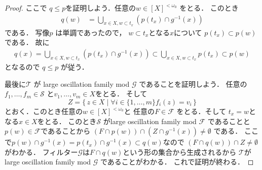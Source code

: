 \documentclass[leqno, a4paper, 12pt]{jsarticle}
\newcommand{\myfinset}[1]{[#1]^{<\omega_{0}}}
\newcommand{\myfil}[1]{\mathcal{#1}}
\newcommand{\myfam}[1]{\mathscr{#1}}
\begin{document}
\begin{proof}
ここで
$q\le p$を証明しよう．任意の$w\in \myfinset{X}$
をとる．
このとき
\begin{align*}
q(w)&=\bigcup_{x\in X, w\subset t_{x}}(p(t_{x})\cap g^{-1}(x))
\end{align*}
である．
写像$p$
は単調であったので，
$w\subset t_{x}$となる$x$について
$p(t_{x})\subset p(w)$である．
故に
\begin{align*}
q(x)=
\bigcup_{x\in X, w\subset t_{x}}(p(t_{x})\cap g^{-1}(x))
\subset 
\bigcup_{x\in X, w\subset t_{x}}p(t_{x})
\subset p(w)
\end{align*}
となるので
$q\le p$
が従う．

最後に$\myfam{T}$
が
large oscillation family mod $\myfil{G}$
であることを証明しよう．
任意の$f_{1}, \dots, f_{m}\in \myfam{S}$
と$v_{1}, \dots, v_{m}\in X$をとる．
そして
\[
Z=\{\, z\in X\mid \forall i\in \{1, \dots, m\} f_{i}(z)=v_{i}\, \}
\]
とおく．このとき任意の$w\in \myfinset{X}$と
任意の$F\in \myfil{F}$
をとる．そして
$t_{x}=w$となる$x\in X$をとる．
このとき$\myfam{S}$
がlarge oscillation family mod $\myfil{F}$
であることと$p(w)\in \myfil{F}$であることから
$(F\cap p(w))\cap(Z\cap g^{-1}(x))\neq \emptyset$
である．
ここで$p(w)\cap g^{-1}(x)=p(t_{x})\cap g^{-1}(x)\subset q(w)$なので
$(F\cap q(w))\cap Z\neq \emptyset$
がわかる．
フィルター$\myfil{G}$は$F\cap q(w)$という形の集合から生成されるから
$\myfam{T}$が
large oscillation family mod 
$\myfam{G}$
であることがわかる．
これで証明が終わる．
\end{proof}
\end{document}
